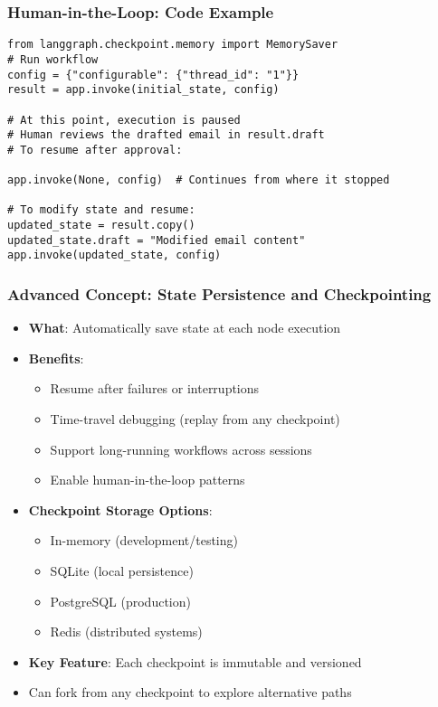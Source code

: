 \begin{frame}[fragile]\frametitle{Human-in-the-Loop: Code Example}
\begin{lstlisting}from langgraph.checkpoint.memory import MemorySaver
# Run workflow
config = {"configurable": {"thread_id": "1"}}
result = app.invoke(initial_state, config)

# At this point, execution is paused
# Human reviews the drafted email in result.draft
# To resume after approval:

app.invoke(None, config)  # Continues from where it stopped

# To modify state and resume:
updated_state = result.copy()
updated_state.draft = "Modified email content"
app.invoke(updated_state, config)
      \end{lstlisting}
\end{frame}

\begin{frame}[fragile]\frametitle{Advanced Concept: State Persistence and Checkpointing}
      \begin{itemize}
        \item \textbf{What}: Automatically save state at each node execution
        \item \textbf{Benefits}:
        \begin{itemize}
            \item Resume after failures or interruptions
            \item Time-travel debugging (replay from any checkpoint)
            \item Support long-running workflows across sessions
            \item Enable human-in-the-loop patterns
        \end{itemize}
        \item \textbf{Checkpoint Storage Options}:
        \begin{itemize}
            \item In-memory (development/testing)
            \item SQLite (local persistence)
            \item PostgreSQL (production)
            \item Redis (distributed systems)
        \end{itemize}
        \item \textbf{Key Feature}: Each checkpoint is immutable and versioned
        \item Can fork from any checkpoint to explore alternative paths
      \end{itemize}
	  

\end{frame}

